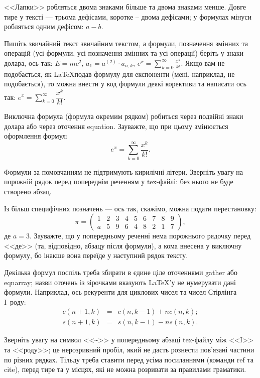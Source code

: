 <<Лапки>> робляться двома знаками більше та двома знаками менше. Довге 
тире у тексті --- трьома дефісами, коротке -- двома дефісами; у формулах 
мінуси робляться одним дефісом: $a-b$.

Пишіть звичайний текст звичайним текстом, а формули, позначення змінних та 
операцій (усі формули, усі позначення змінних та усі операції) беріть у 
знаки долара, ось так: $E = mc^2$, $a_1 = a^{(2)} \cdot a_{n, k}$, $e^x = 
\sum_{k = 0}^{\infty} {\frac{x^k}{k!}}$. Якщо вам 
не подобається, як \LaTeX подав формулу для експоненти (мені, наприклад, 
не подобається), то можна внести у код формули деякі корективи та написати ось так: $e^x 
= \sum\limits_{k = 0}^{\infty} {\dfrac{x^k}{k!}}$.

Виключна формула (формула окремим рядком) робиться через подвійні знаки 
долара або через оточення equation. Зауважте, що при цьому змінюється 
оформлення формул:
$$e^x = \sum_{k = 0}^{\infty} {\frac{x^k}{k!}}.$$

Формули за помовчанням не підтримують кирилічні літери. Зверніть увагу на 
порожній рядок перед попереднім реченням у tex-файлі: без нього не буде 
створено абзац.

Із більш специфічних позначень --- ось так, скажімо, можна подати 
перестановку:
$$\pi = \begin{pmatrix}
1 & 2 & 3 & 4 & 5 & 6 & 7 & 8 & 9\\
a & 5 & 9 & 6 & 4 & 8 & 2 & 1 & 7
\end{pmatrix},$$
де $a=3$. Зауважте, що у попередньому реченні нема порожнього рядочку 
перед <<де>> (та, відповідно, абзацу після формули), а кома внесена у 
виключну формулу, бо інакше вона переїде у наступний рядок тексту.

Декілька формул поспіль треба збирати в єдине ціле оточеннями gather або 
eqnarray; назви оточень із зірочками вказують \LaTeX'у не нумерувати дані 
формули. Наприклад, ось рекуренти для циклових чисел та чисел Стірлінга 
I~роду:
\begin{eqnarray*}
c(n+1, k) &=& c(n, k-1)+nc(n, k); \\
s(n+1, k) &=& s(n, k-1)-ns(n, k).
\end{eqnarray*}

Зверніть увагу на символ <<\verb|~|>> у попередньому абзаці tex-файлу між 
<<I>> та <<роду>>; це нерозривний пробіл, який не дасть рознести пов'язані 
частини по різних рядках. Тільду треба ставити перед усіма посиланнями 
(команди ref та cite), перед тире та у місцях, які не можна розривати за 
правилами граматики.

